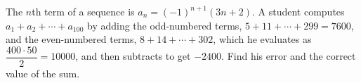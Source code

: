 The $n$th term of a sequence is $a_n=(-1)^{n+1}(3n+2)$. A student computes $a_1+a_2+\cdots+a_{100}$ by adding the odd-numbered terms, $5+11+\cdots+299=7600$, and the even-numbered terms, $8+14+\cdots+302$, which he evaluates as $\dfrac{400\cdot50}{2}=10000$, and then subtracts to get $-2400$. Find his error and the correct value of the sum.
